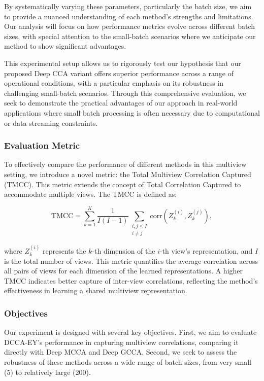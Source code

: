 By systematically varying these parameters, particularly the batch size, we aim to provide a nuanced understanding of each method's strengths and limitations. Our analysis will focus on how performance metrics evolve across different batch sizes, with special attention to the small-batch scenarios where we anticipate our method to show significant advantages.

This experimental setup allows us to rigorously test our hypothesis that our proposed Deep CCA variant offers superior performance across a range of operational conditions, with a particular emphasis on its robustness in challenging small-batch scenarios. Through this comprehensive evaluation, we seek to demonstrate the practical advantages of our approach in real-world applications where small batch processing is often necessary due to computational or data streaming constraints.

\subsubsection{Evaluation Metric}

To effectively compare the performance of different methods in this multiview setting, we introduce a novel metric: the Total Multiview Correlation Captured (TMCC). This metric extends the concept of Total Correlation Captured to accommodate multiple views. The TMCC is defined as:

\[
    \text{TMCC} = \sum_{k=1}^{K} \frac{1}{I(I-1)} \sum_{\substack{i,j \leq I \\ i \neq j}} \text{corr}(Z_k^{(i)}, Z_k^{(j)}),
\]

where \( Z_k^{(i)} \) represents the \( k \)-th dimension of the \( i \)-th view's representation, and $I$ is the total number of views. This metric quantifies the average correlation across all pairs of views for each dimension of the learned representations. A higher TMCC indicates better capture of inter-view correlations, reflecting the method's effectiveness in learning a shared multiview representation.

\subsubsection{Objectives}

Our experiment is designed with several key objectives. First, we aim to evaluate DCCA-EY's performance in capturing multiview correlations, comparing it directly with Deep MCCA and Deep GCCA. Second, we seek to assess the robustness of these methods across a wide range of batch sizes, from very small (5) to relatively large (200).

